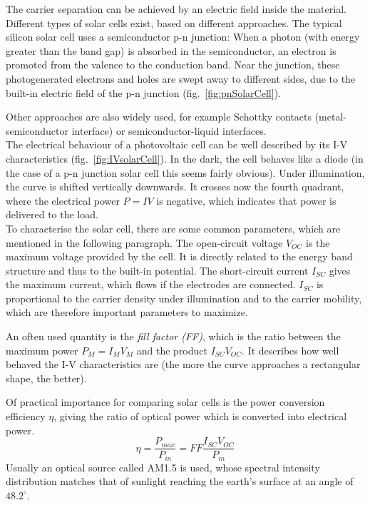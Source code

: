 The carrier separation can be achieved by an electric field inside the material. Different types of solar cells exist, based on different approaches. The typical silicon solar cell uses a semiconductor p-n junction: When a photon (with energy greater than the band gap) is absorbed in the semiconductor, an electron is promoted from the valence to the conduction band. Near the junction, these photogenerated electrons and holes are swept away to different sides, due to the built-in electric field of the p-n junction (fig.~\ref{fig:pnSolarCell}). 

Other approaches are also widely used, for example Schottky contacts (metal-semiconductor interface) or semiconductor-liquid interfaces.\\

The electrical behaviour of a photovoltaic cell can be well described by its I-V characteristics (fig.~\ref{fig:IVsolarCell}). In the dark, the cell behaves like a diode (in the case of a p-n junction solar cell this seems fairly obvious). Under illumination, the curve is shifted vertically downwards. It crosses now the fourth quadrant, where the electrical power $P=IV$ is negative, which indicates that power is delivered to the load.\\

To characterise the solar cell, there are some common parameters, which are mentioned in the following paragraph. The open-circuit voltage $V_{OC}$ is the maximum voltage provided by the cell. It is directly related to the energy band structure and thus to the built-in potential. The short-circuit current $I_{SC}$ gives the maximum current, which flows if the electrodes are connected. $I_{SC}$ is proportional to the carrier density under illumination and to the carrier mobility, which are therefore important parameters to maximize.

An often used quantity is the \textit{fill factor (FF)}, which is the ratio between the maximum power $P_M=I_M V_M$ and the product $I_{SC} V_{OC}$. It describes how well behaved the I-V characteristics are (the more the curve approaches a rectangular shape, the better).

Of practical importance for comparing solar cells is the power conversion efficiency $\eta$, giving the ratio of optical power which is converted into electrical power. 
\[\eta = \frac{P_{max}}{P_{in}} = FF\frac{I_{SC}V_{OC}}{P_{in}}\]
Usually an optical source called AM1.5 is used, whose spectral intensity distribution matches that of sunlight reaching the earth's surface at an angle of $48.2^{\circ}$. \cite[pp.426-433]{ChemRev}

